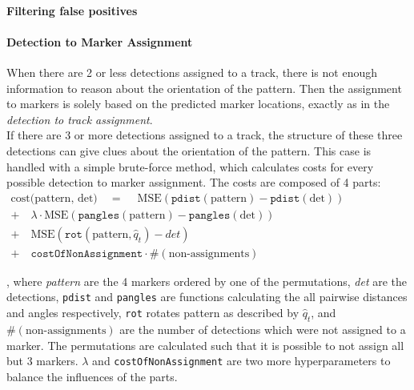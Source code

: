 \documentclass{article}
\begin{document}
\paragraph{Filtering false positives} %

\paragraph{Detection to Marker Assignment}
\label{dtma}
When there are 2 or less detections assigned to a track, there is not enough information to reason about the orientation of the pattern. Then the assignment to markers is solely based on the predicted marker locations, exactly as in the \emph{detection to track assignment}.\\
If there are 3 or more detections assigned to a track, the structure of these three detections can give clues about the orientation of the pattern. This case is handled with a simple brute-force method, which calculates costs for every possible detection to marker assignment. The costs are composed of 4 parts:
\begin{equation}
\begin{split}
 \text{cost(pattern, det)} \quad = \quad  ~ \text{MSE}\left(\texttt{pdist}(\text{pattern}) - \texttt{pdist}(\text{det}) \right)  \qquad \qquad \qquad \qquad \qquad \quad \\
  +\quad \lambda \cdot \text{MSE}\left( \texttt{pangles}(\text{pattern}) - \texttt{pangles}(\text{det}) \right) \qquad \qquad \qquad ~~ \\
  +\quad \text{MSE}\left(\texttt{rot}(\text{pattern},\hat{q}_t) - det\right) \quad \qquad \qquad \qquad \qquad \qquad \quad ~\\
  +\quad \texttt{costOfNonAssignment} \cdot \#(\text{non-assignments}) \quad \qquad \qquad \quad
\end{split}
\end{equation}

, where \emph{pattern} are the 4 markers ordered by one of the permutations, \emph{det} are the detections, \texttt{pdist} and \texttt{pangles} are functions calculating the all pairwise distances and angles respectively,  \texttt{rot} rotates pattern as described by $\hat{q}_t$, and $\#(\text{non-assignments})$ are the number of detections which were not assigned to a marker. The permutations are calculated such that it is possible to not assign all but 3 markers. $\lambda$ and \texttt{costOfNonAssignment} are two more hyperparameters to balance the influences of the parts.
\end{document}
